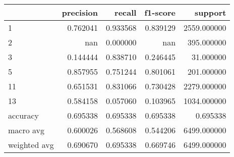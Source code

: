 \begin{tabular}{lrrrr}
\toprule
 & precision & recall & f1-score & support \\
\midrule
1 & 0.762041 & 0.933568 & 0.839129 & 2559.000000 \\
2 & nan & 0.000000 & nan & 395.000000 \\
3 & 0.144444 & 0.838710 & 0.246445 & 31.000000 \\
5 & 0.857955 & 0.751244 & 0.801061 & 201.000000 \\
11 & 0.651531 & 0.831066 & 0.730428 & 2279.000000 \\
13 & 0.584158 & 0.057060 & 0.103965 & 1034.000000 \\
accuracy & 0.695338 & 0.695338 & 0.695338 & 0.695338 \\
macro avg & 0.600026 & 0.568608 & 0.544206 & 6499.000000 \\
weighted avg & 0.690670 & 0.695338 & 0.669746 & 6499.000000 \\
\bottomrule
\end{tabular}
